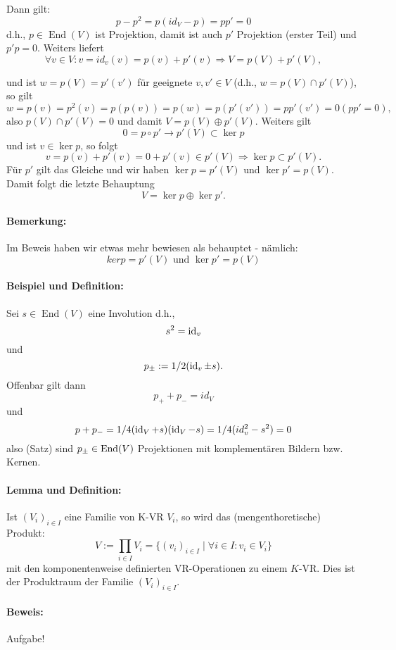 	Dann gilt:
		\[p-p^2 = p(id_V-p) = pp' = 0\]
	d.h., $p\in\operatorname{End}(V)$ ist Projektion, damit ist auch $p'$ Projektion (erster Teil) und $p' p = 0 $. Weiters liefert
		\[\forall v\in V: v=id_v(v) = p(v) + p'(v) \Rightarrow V = p(V)+p'(V),\]

	und ist $w = p(V)= p'(v')$ für geeignete $v,v'\in V$ (d.h., $w  = p(V)\cap p'(V)$), so gilt
		\[ w = p(v) = p^2(v) = p(p(v)) = p(w) = p(p'(v')) = pp'(v') = 0 (pp' = 0), \]
	also $p(V)\cap p'(V) = {0}$ und damit $V = p(V)\oplus p'(V)$. Weiters gilt
		\[0 = p \circ p' \rightarrow p'(V)\subset \ker p\]
	und ist $v\in \ker p$, so folgt
		\[v = p(v) + p'(v) = 0 + p'(v)\in p'(V) \Rightarrow \ker p \subset p'(V).\]
	Für $p'$ gilt das Gleiche und wir haben $\ker p = p'(V)$ und $\ker p' = p(V)$.
	Damit folgt die letzte Behauptung 
		\[V = \ker p \oplus\ker p'.\]
	
\paragraph{Bemerkung: }
		Im Beweis haben wir etwas mehr bewiesen als behauptet - nämlich:
			\[ ker p = p'(V)\text{ und }\ker p' = p(V) \]
		
\paragraph{Beispiel und Definition: }	
		Sei $s\in \operatorname{End}(V)$ eine Involution d.h., 
			\[ s^2 = \operatorname{id}_v \] 
		und 
			\[ p_\pm := 1/2(\operatorname{id}_v\pm s). \]
		Offenbar gilt dann
			\[ p_{+} + p_{-} = id_V \] 
		und 
			\[ p + p_{-} = 1/4(\operatorname{id}_V +s)(\operatorname{id}_V -s) = 1/4(id_v^2-s^2)=0 \]
		also (Satz) sind $p_\pm\in\operatorname{End}(V)$ Projektionen mit komplementären Bildern bzw. Kernen.
		
\paragraph{Lemma und Definition: }
		Ist $(V_i)_{i\in I}$ eine Familie von K-VR $V_i$, so wird das (mengenthoretische) Produkt:
			\[V:= \prod_{i\in I}V_i=\{(v_i)_{i\in I}\mid\forall i\in I:v_i\in V_i\}\]
		mit den komponentenweise definierten VR-Operationen zu einem $ K $-VR. Dies ist der Produktraum der Familie	$(V_i)_{i\in I}$.
		
\paragraph{Beweis: } Aufgabe!

